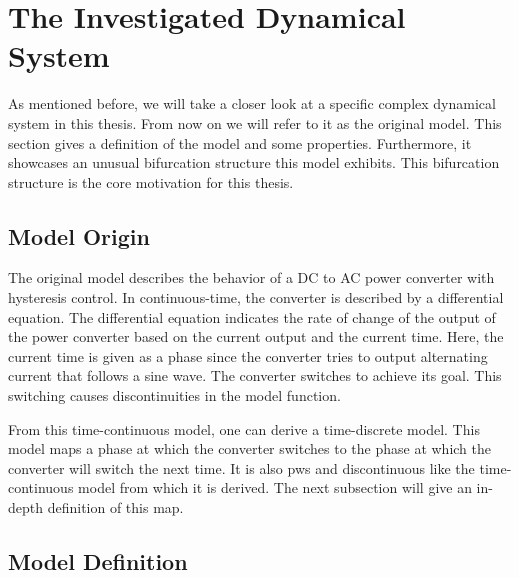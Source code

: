 \section{The Investigated Dynamical System}
\label{sec:state.og}

As mentioned before, we will take a closer look at a specific complex dynamical system in this thesis.
From now on we will refer to it as the original model.
This section gives a definition of the model and some properties.
Furthermore, it showcases an unusual bifurcation structure this model exhibits.
This bifurcation structure is the core motivation for this thesis.

\subsection{Model Origin}
\label{sec:state.og.orig}

The original model describes the behavior of a DC to AC power converter with hysteresis control.
In continuous-time, the converter is described by a differential equation.
The differential equation indicates the rate of change of the output of the power converter based on the current output and the current time.
Here, the current time is given as a phase since the converter tries to output alternating current that follows a sine wave.
The converter switches to achieve its goal.
This switching causes discontinuities in the model function.

From this time-continuous model, one can derive a time-discrete model.
This model maps a phase at which the converter switches to the phase at which the converter will switch the next time.
It is also \gls{pws} and discontinuous like the time-continuous model from which it is derived.
The next subsection will give an in-depth definition of this map.

\subsection{Model Definition}
\label{sec:state.og.def}

